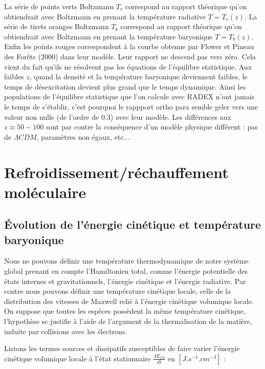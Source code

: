 \documentclass[10pt, a4paper]{report}
\numberwithin{equation}{subsection}
\begin{document}
La série de points verts Boltzmann $T_r$ correspond au rapport théorique qu'on obtiendrait avec Boltzmann en prenant la température radiative $T=T_r(z)$.
La série de tirets oranges Boltzmann $T_b$ correspond au rapport théorique qu'on obtiendrait avec Boltzmann en prenant la température baryonique $T=T_b(z)$.
Enfin les points rouges correspondent à la courbe obtenue par Flower et Pineau des Forêts (2000) dans leur modèle. 
Leur rapport ne descend pas vers zéro. Cela vient du fait qu’ils ne résolvent pas les équations de l’équilibre statistique. Aux faibles $z$, quand la densité et la température baryonique deviennent faibles, le temps de désexcitation devient plus grand que le temps dynamique. Ainsi les populations de l'équilibre statistique que l'on calcule avec RADEX n'ont jamais le temps de s'établir, c'est pourquoi le rappport ortho para semble geler vers une valeur non nulle (de l’ordre de 0.3) avec leur modèle. Les différences aux $z \approx 50 - 100$ sont par contre la conséquence d'un modèle physique différent : pas de $\Lambda CDM$, paramètres non égaux, etc...

\section{Refroidissement/réchauffement moléculaire}
\subsection{\uppercase{é}volution de l'énergie cinétique et température baryonique}
Nous ne pouvons définir une température thermodynamique de notre système global prenant en compte l'Hamiltonien total, comme l'énergie potentielle des états internes et gravitationnels, l'énergie cinétique et l'énergie radiative. Par contre nous pouvons définir une température cinétique locale, celle de la distribution des vitesses de Maxwell relié à l'énergie cinétique volumique locale. On suppose que toutes les espèces possèdent la même température cinétique, l'hypothèse se justifie à l'aide de l'argument de la thermalisation de la matière, induite par collisions avec les électrons. 
\bigskip
\large

Listons les termes sources et dissipatifs susceptibles de faire varier l'énergie cinétique volumique locale à l’état stationnaire $\frac{dE_{CV} }{dt}$ en $[J.s^{-1}.cm^{-3}]$ :\\
\end{document}

